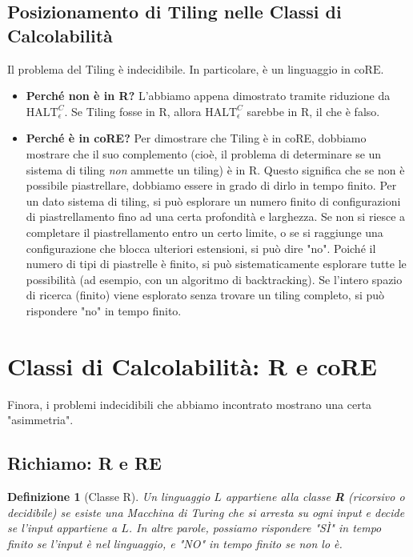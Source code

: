 \documentclass[a4paper]{article}
\newtheorem{definition}{Definizione}
\begin{document}
\subsection{Posizionamento di Tiling nelle Classi di Calcolabilit\`a}
Il problema del Tiling è indecidibile. In particolare, è un linguaggio in $\text{coRE}$.
\begin{itemize}
    \item \textbf{Perché non è in R?} L'abbiamo appena dimostrato tramite riduzione da $\text{HALT}_\epsilon^C$. Se Tiling fosse in R, allora $\text{HALT}_\epsilon^C$ sarebbe in R, il che è falso.
    \item \textbf{Perché è in coRE?} Per dimostrare che Tiling è in coRE, dobbiamo mostrare che il suo complemento (cioè, il problema di determinare se un sistema di tiling \emph{non} ammette un tiling) è in R. Questo significa che se non è possibile piastrellare, dobbiamo essere in grado di dirlo in tempo finito.
    Per un dato sistema di tiling, si può esplorare un numero finito di configurazioni di piastrellamento fino ad una certa profondità e larghezza. Se non si riesce a completare il piastrellamento entro un certo limite, o se si raggiunge una configurazione che blocca ulteriori estensioni, si può dire "no". Poiché il numero di tipi di piastrelle è finito, si può sistematicamente esplorare tutte le possibilità (ad esempio, con un algoritmo di backtracking). Se l'intero spazio di ricerca (finito) viene esplorato senza trovare un tiling completo, si può rispondere "no" in tempo finito.
\end{itemize}

\section{Classi di Calcolabilit\`a: R e coRE}
Finora, i problemi indecidibili che abbiamo incontrato mostrano una certa "asimmetria".

\subsection{Richiamo: R e RE}
\begin{definition}[Classe R]
Un linguaggio $L$ appartiene alla classe \textbf{R} (ricorsivo o decidibile) se esiste una Macchina di Turing che si arresta su ogni input e decide se l'input appartiene a $L$. In altre parole, possiamo rispondere "SÌ" in tempo finito se l'input è nel linguaggio, e "NO" in tempo finito se non lo è.
\end{definition}
\end{document}
